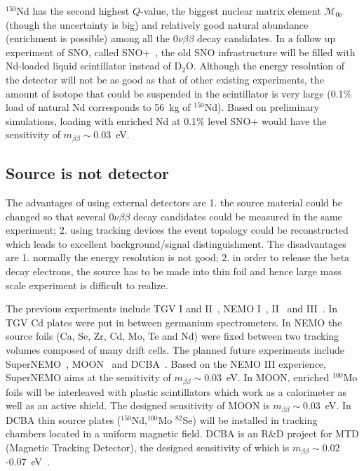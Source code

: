$^{150}$Nd has the second highest $Q$-value, the biggest nuclear matrix element $\mathcal{M}_{0\nu}$ (though the uncertainty is big) and relatively good natural abundance (enrichment is possible) among all the $0\nu\beta\beta$ decay candidates. In a follow up experiment of SNO, called SNO+~\cite{Zub07}, the old SNO infrastructure will be filled with Nd-loaded liquid scintillator instead of D$_{2}$O. Although the energy resolution of the detector will not be as good as that of other existing experiments, the amount of isotope that could be suspended in the scintillator is very large (0.1\% load of natural Nd corresponds to 56~kg of $^{150}$Nd). Based on preliminary simulations, loading with enriched Nd at 0.1\% level SNO+ would have the sensitivity of $m_{\beta\beta} \sim 0.03$~eV.

\subsection{Source is not  detector}
\label{sec:exp:sued}
The advantages of using external detectors are 1. the source material could be changed so that several $0\nu\beta\beta$ decay candidates could be measured in the same experiment; 2. using tracking devices the event topology could be reconstructed which leads to excellent background/signal distinguishment. The disadvantages are 1. normally the energy resolution is not good; 2. in order to release the beta decay electrons, the source has to be made into thin foil and hence large mass scale experiment is difficult to realize.

The previous experiments include TGV I and II~\cite{Ste98, Ste00,   Ste06}, NEMO I~\cite{Das91}, II~\cite{Arn95} and III~\cite{Arn05,   Arn07}. In TGV Cd plates were put in between germanium spectrometers.  In NEMO the source foils (Ca, Se, Zr, Cd, Mo, Te and Nd) were fixed between two tracking volumes composed of many drift cells. The planned future experiments include SuperNEMO~\cite{Sne08}, MOON~\cite{Nak06} and DCBA~\cite{Ish05}. Based on the NEMO III experience, SuperNEMO aims at the sensitivity of $m_{\beta\beta} \sim 0.03$~eV. In MOON, enriched $^{100}$Mo foils will be interleaved with plastic scintillators which work as a calorimeter as well as an active shield.  The designed sensitivity of MOON is $m_{\beta\beta} \sim 0.03$~eV. In DCBA thin source plates ($^{150}$Nd,$^{100}$Mo $^{82}$Se) will be installed in tracking chambers located in a uniform magnetic field. DCBA is an R\&D project for MTD (Magnetic Tracking Detector), the designed sensitivity of which is $m_{\beta\beta} \sim 0.02$-0.07~eV~\cite{Ish07}.


